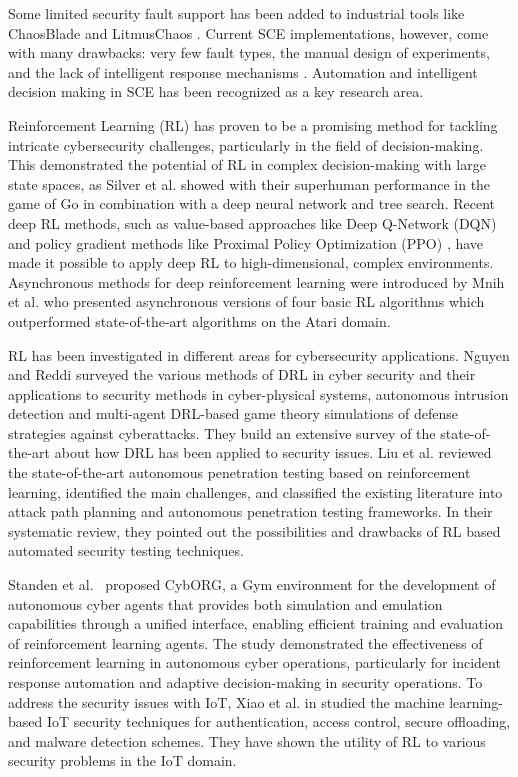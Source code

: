 \documentclass[conference,10pt]{IEEEtran}
\begin{document}
Some limited security fault support has been added to industrial tools like ChaosBlade \cite{chaosblade2021} and LitmusChaos \cite{litmus2022}. Current SCE implementations, however, come with many drawbacks: very few fault types, the manual design of experiments, and the lack of intelligent response mechanisms \cite{shortridge2023security}. Automation and intelligent decision making in SCE has been recognized as a key research area.

Reinforcement Learning (RL) has proven to be a promising method for tackling intricate cybersecurity challenges, particularly in the field of decision-making. This demonstrated the potential of RL in complex decision-making with large state spaces, as Silver et al. \cite{silver2016mastering} showed with their superhuman performance in the game of Go in combination with a deep neural network and tree search. Recent deep RL methods, such as value-based approaches like Deep Q-Network (DQN) \cite{mnih2015human} and policy gradient methods like Proximal Policy Optimization (PPO) \cite{schulman2017ppo}, have made it possible to apply deep RL to high-dimensional, complex environments. Asynchronous methods for deep reinforcement learning were introduced by Mnih et al. \cite{mnih2016asynchronous} who presented asynchronous versions of four basic RL algorithms which outperformed state-of-the-art algorithms on the Atari domain.

RL has been investigated in different areas for cybersecurity applications. Nguyen and Reddi \cite{nguyen2021deep} surveyed the various methods of DRL in cyber security and their applications to security methods in cyber-physical systems, autonomous intrusion detection and multi-agent DRL-based game theory simulations of defense strategies against cyberattacks. They build an extensive survey of the state-of-the-art about how DRL has been applied to security issues. Liu et al. \cite{liu2025autonomous} reviewed the state-of-the-art autonomous penetration testing based on reinforcement learning, identified the main challenges, and classified the existing literature into attack path planning and autonomous penetration testing frameworks. In their systematic review, they pointed out the possibilities and drawbacks of RL based automated security testing techniques.

Standen et al.~\cite{standen2021cyborg} proposed CybORG, a Gym environment for the development of autonomous cyber agents that provides both simulation and emulation capabilities through a unified interface, enabling efficient training and evaluation of reinforcement learning agents. The study demonstrated the effectiveness of reinforcement learning in autonomous cyber operations, particularly for incident response automation and adaptive decision-making in security operations. To address the security issues with IoT, Xiao et al. in \cite{xiao2018iot} studied the machine learning-based IoT security techniques for authentication, access control, secure offloading, and malware detection schemes. They have shown the utility of RL to various security problems in the IoT domain.
\end{document}

